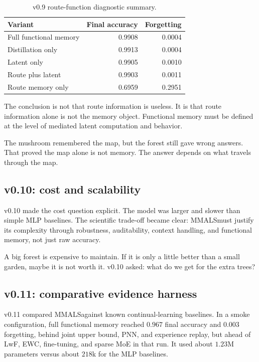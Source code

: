\documentclass[11pt]{article}
\newcommand{\mmals}{\textsc{MMALS}}
\begin{document}
\begin{table}[h]
\centering
\caption{v0.9 route-function diagnostic summary.}
\begin{tabular}{lrr}
\toprule
Variant & Final accuracy & Forgetting \\
\midrule
Full functional memory & 0.9908 & 0.0004 \\
Distillation only & 0.9913 & 0.0004 \\
Latent only & 0.9905 & 0.0010 \\
Route plus latent & 0.9903 & 0.0011 \\
Route memory only & 0.6959 & 0.2951 \\
\bottomrule
\end{tabular}
\end{table}

The conclusion is not that route information is useless. It is that route information alone is not the memory object. Functional memory must be defined at the level of mediated latent computation and behavior.

\begin{kidbox}
The mushroom remembered the map, but the forest still gave wrong answers. That proved the map alone is not memory. The answer depends on what travels through the map.
\end{kidbox}

\subsection{v0.10: cost and scalability}

v0.10 made the cost question explicit. The model was larger and slower than simple MLP baselines. The scientific trade-off became clear: \mmals must justify its complexity through robustness, auditability, context handling, and functional memory, not just raw accuracy.

\begin{kidbox}
A big forest is expensive to maintain. If it is only a little better than a small garden, maybe it is not worth it. v0.10 asked: what do we get for the extra trees?
\end{kidbox}

\subsection{v0.11: comparative evidence harness}

v0.11 compared \mmals against known continual-learning baselines. In a smoke configuration, full functional memory reached $0.967$ final accuracy and $0.003$ forgetting, behind joint upper bound, PNN, and experience replay, but ahead of LwF, EWC, fine-tuning, and sparse MoE in that run. It used about $1.23$M parameters versus about $218$k for the MLP baselines.
\end{document}
